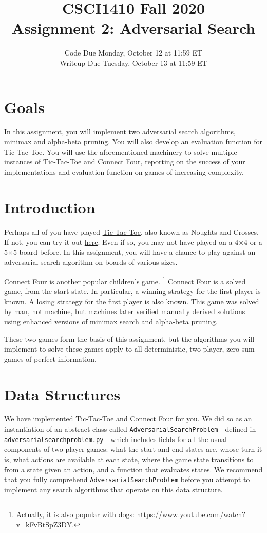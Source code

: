 \documentclass{article}
\title{CSCI1410 Fall 2020 \\
Assignment 2: Adversarial Search}
\date{Code Due Monday, October 12 at 11:59 ET \\ [1ex]
Writeup Due Tuesday, October 13 at 11:59 ET}
\begin{document}
\maketitle


\section{Goals}
In this assignment, you will implement two adversarial search algorithms,
minimax and alpha-beta pruning.
You will also develop an evaluation function for Tic-Tac-Toe.
You will use the aforementioned machinery to solve multiple instances of Tic-Tac-Toe and Connect Four,
reporting on the success of your implementations and evaluation function on games of increasing complexity.


\section{Introduction}
Perhaps all of you have played \href{https://en.wikipedia.org/wiki/Tic-tac-toe}{Tic-Tac-Toe},
also known as Noughts and Crosses.
If not, you can try it out \href{https://playtictactoe.org/}{here}.
Even if so, you may not have played on a 4$\times$4 or a 5$\times$5 board before.
In this assignment, you will have a chance to play against an adversarial search algorithm on boards of various sizes.

\href{https://en.wikipedia.org/wiki/Connect_Four}{Connect Four} is another popular children's game.%
\footnote{Actually, it is also popular with dogs: \url{https://www.youtube.com/watch?v=kFvBtSpZ3DY}.}
Connect Four is a solved game, from the start state.
In particular, a winning strategy for the first player is known.
A losing strategy for the first player is also known.
This game was solved by man, not machine,
but machines later verified manually derived solutions
using enhanced versions of minimax search and alpha-beta pruning.

These two games form the basis of this assignment,
but the algorithms you will implement to solve these games apply to all
deterministic, two-player, zero-sum games of perfect information.


\section{Data Structures}
We have implemented Tic-Tac-Toe and Connect Four for you.
We did so as an instantiation of an abstract class called
\verb|AdversarialSearchProblem|---defined in \verb|adversarialsearchproblem.py|---which
includes fields for all the usual components of two-player games:
what the start and end states are,
whose turn it is,
what actions are available at each state,
where the game state transitions to from a state given an action,
and a function that evaluates states.
We recommend that you fully comprehend
\verb|AdversarialSearchProblem| before you attempt to
implement any search algorithms that operate on this data structure.
\end{document}
